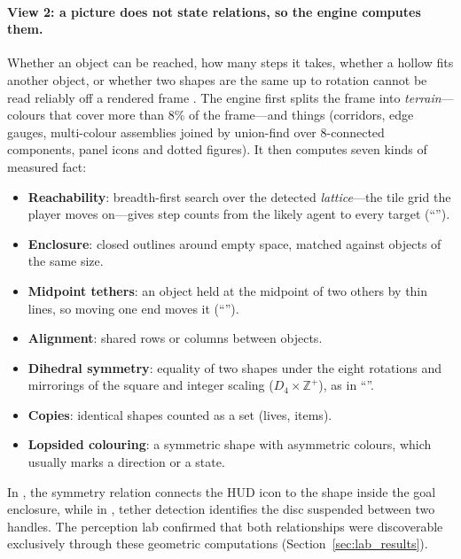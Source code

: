 \paragraph{View 2: a picture does not state relations, so the engine computes them.}
Whether an object can be reached, how many steps it takes, whether a hollow fits another object, or whether two shapes are the same up to rotation cannot be read reliably off a rendered frame \citep{rahmanzadehgervi2024blind}. The engine first splits the frame into \emph{terrain}---colours that cover more than 8\% of the frame---and things (corridors, edge gauges, multi-colour assemblies joined by union-find over 8-connected components, panel icons and dotted figures). It then computes seven kinds of measured fact:
\begin{itemize}
    \item \textbf{Reachability}: breadth-first search over the detected \emph{lattice}---the tile grid the player moves on---gives step counts from the likely agent to every target (``'').
    \item \textbf{Enclosure}: closed outlines around empty space, matched against objects of the same size.
    \item \textbf{Midpoint tethers}: an object held at the midpoint of two others by thin lines, so moving one end moves it (``'').
    \item \textbf{Alignment}: shared rows or columns between objects.
    \item \textbf{Dihedral symmetry}: equality of two shapes under the eight rotations and mirrorings of the square and integer scaling ($D_4 \times \mathbb{Z}^+$), as in ``''.
    \item \textbf{Copies}: identical shapes counted as a set (lives, items).
    \item \textbf{Lopsided colouring}: a symmetric shape with asymmetric colours, which usually marks a direction or a state.
\end{itemize}
In , the symmetry relation connects the HUD icon to the shape inside the goal enclosure, while in , tether detection identifies the disc suspended between two handles. The perception lab confirmed that both relationships were discoverable exclusively through these geometric computations (Section~\ref{sec:lab_results}).

